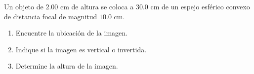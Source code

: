 \item Un objeto de $2.00\text{ cm}$ de altura se coloca a $30.0\text{ cm}$ de un espejo esférico convexo de distancia focal de magnitud $10.0\text{ cm}$.
\begin{enumerate}
    \item Encuentre la ubicación de la imagen.
    \item Indique si la imagen es vertical o invertida.
    \item Determine la altura de la imagen.
\end{enumerate}